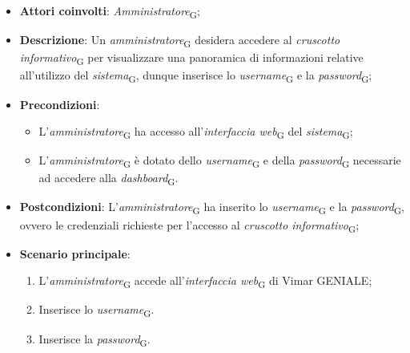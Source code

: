 \begin{itemize}
    \item \textbf{Attori coinvolti}: \textit{Amministratore}\textsubscript{G};
    \item \textbf{Descrizione}: Un \textit{amministratore}\textsubscript{G} desidera accedere al \textit{cruscotto informativo}\textsubscript{G} per visualizzare una panoramica di informazioni relative all’utilizzo del \textit{sistema}\textsubscript{G}, dunque inserisce lo \textit{username}\textsubscript{G} e la \textit{password}\textsubscript{G};
    \item \textbf{Precondizioni}: 
        \begin{itemize}
            \item L’\textit{amministratore}\textsubscript{G} ha accesso all’\textit{interfaccia web}\textsubscript{G} del \textit{sistema}\textsubscript{G};
            \item L’\textit{amministratore}\textsubscript{G} è dotato dello \textit{username}\textsubscript{G} e della \textit{password}\textsubscript{G} necessarie ad accedere alla \textit{dashboard}\textsubscript{G}.
        \end{itemize}
    \item \textbf{Postcondizioni}: L’\textit{amministratore}\textsubscript{G} ha inserito lo \textit{username}\textsubscript{G} e la \textit{password}\textsubscript{G}, ovvero le credenziali richieste per l’accesso al \textit{cruscotto informativo}\textsubscript{G};
    \item \textbf{Scenario principale}:
    \begin{enumerate}
    \item L’\textit{amministratore}\textsubscript{G} accede all’\textit{interfaccia web}\textsubscript{G} di Vimar GENIALE;
    \item Inserisce lo \textit{username}\textsubscript{G}.
    \item Inserisce la \textit{password}\textsubscript{G}.
    \end{enumerate}
\end{itemize}



